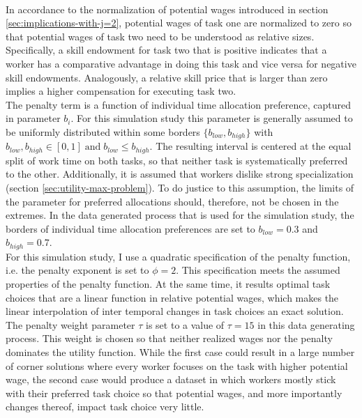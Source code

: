 \documentclass[../main.tex]{subfiles}
\begin{document}
\\
In accordance to the normalization of potential wages introduced in section \ref{sec:implications-with-j=2}, potential wages of task one are normalized to zero so that potential wages of task two need to be understood as relative sizes. Specifically, a skill endowment for task two that is positive indicates that a worker has a comparative advantage in doing this task and vice versa for negative skill endowments. Analogously, a relative skill price that is larger than zero implies a higher compensation for executing task two.
\\
The penalty term is a function of individual time allocation preference, captured in parameter $b_i$. For this simulation study this parameter is generally assumed to be uniformly distributed within some borders $\{b_{low}, b_{high}\}$ with $b_{low}, b_{high} \in [0, 1] \; \text{and} \; b_{low} \leq b_{high}$. The resulting interval is centered at the equal split of work time on both tasks, so that neither task is systematically preferred to the other. Additionally, it is assumed that workers dislike strong specialization (section \ref{sec:utility-max-problem}). To do justice to this assumption, the limits of the parameter for preferred allocations should, therefore, not be chosen in the extremes. In the data generated process that is used for the simulation study, the borders of individual time allocation preferences are set to $b_{low} = 0.3$ and $b_{high} = 0.7$.
\\
For this simulation study, I use a quadratic specification of the penalty function, i.e. the penalty exponent is set to $\phi = 2$. This specification meets  the assumed properties of the penalty function. 
At the same time, it results optimal task choices that are a linear function in relative potential wages, which makes the linear interpolation of inter temporal changes in task choices an exact solution. The penalty weight parameter $\tau$ is set to a value of $\tau = 15$ in this data generating process. This weight is chosen so that neither realized wages nor the penalty dominates the utility function.
While the first case could result in a large number of corner solutions where every worker focuses on the task with higher potential wage, the second case would produce a dataset in which workers mostly stick with their preferred task choice so that potential wages, and more importantly changes thereof, impact task choice very little.
\end{document}
